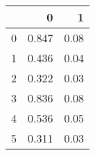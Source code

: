 \begin{tabular}{lrr}
\toprule
{} &      0 &     1 \\
\midrule
0 &  0.847 &  0.08 \\
1 &  0.436 &  0.04 \\
2 &  0.322 &  0.03 \\
3 &  0.836 &  0.08 \\
4 &  0.536 &  0.05 \\
5 &  0.311 &  0.03 \\
\bottomrule
\end{tabular}
